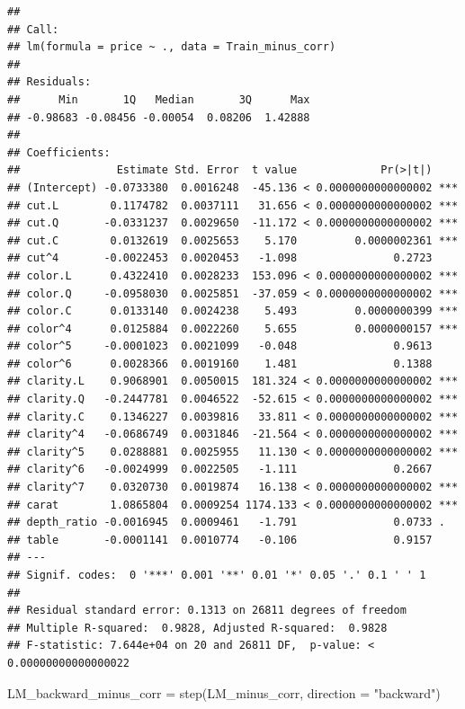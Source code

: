 \documentclass[
]{article}
\newenvironment{Shaded}{\begin{snugshade}}{\end{snugshade}}
\newcommand{\AttributeTok}[1]{\textcolor[rgb]{0.77,0.63,0.00}{#1}}
\newcommand{\FunctionTok}[1]{\textcolor[rgb]{0.00,0.00,0.00}{#1}}
\newcommand{\NormalTok}[1]{#1}
\newcommand{\OtherTok}[1]{\textcolor[rgb]{0.56,0.35,0.01}{#1}}
\newcommand{\StringTok}[1]{\textcolor[rgb]{0.31,0.60,0.02}{#1}}
\begin{document}
\begin{verbatim}
## 
## Call:
## lm(formula = price ~ ., data = Train_minus_corr)
## 
## Residuals:
##      Min       1Q   Median       3Q      Max 
## -0.98683 -0.08456 -0.00054  0.08206  1.42888 
## 
## Coefficients:
##               Estimate Std. Error  t value             Pr(>|t|)    
## (Intercept) -0.0733380  0.0016248  -45.136 < 0.0000000000000002 ***
## cut.L        0.1174782  0.0037111   31.656 < 0.0000000000000002 ***
## cut.Q       -0.0331237  0.0029650  -11.172 < 0.0000000000000002 ***
## cut.C        0.0132619  0.0025653    5.170         0.0000002361 ***
## cut^4       -0.0022453  0.0020453   -1.098               0.2723    
## color.L      0.4322410  0.0028233  153.096 < 0.0000000000000002 ***
## color.Q     -0.0958030  0.0025851  -37.059 < 0.0000000000000002 ***
## color.C      0.0133140  0.0024238    5.493         0.0000000399 ***
## color^4      0.0125884  0.0022260    5.655         0.0000000157 ***
## color^5     -0.0001023  0.0021099   -0.048               0.9613    
## color^6      0.0028366  0.0019160    1.481               0.1388    
## clarity.L    0.9068901  0.0050015  181.324 < 0.0000000000000002 ***
## clarity.Q   -0.2447781  0.0046522  -52.615 < 0.0000000000000002 ***
## clarity.C    0.1346227  0.0039816   33.811 < 0.0000000000000002 ***
## clarity^4   -0.0686749  0.0031846  -21.564 < 0.0000000000000002 ***
## clarity^5    0.0288881  0.0025955   11.130 < 0.0000000000000002 ***
## clarity^6   -0.0024999  0.0022505   -1.111               0.2667    
## clarity^7    0.0320730  0.0019874   16.138 < 0.0000000000000002 ***
## carat        1.0865804  0.0009254 1174.133 < 0.0000000000000002 ***
## depth_ratio -0.0016945  0.0009461   -1.791               0.0733 .  
## table       -0.0001141  0.0010774   -0.106               0.9157    
## ---
## Signif. codes:  0 '***' 0.001 '**' 0.01 '*' 0.05 '.' 0.1 ' ' 1
## 
## Residual standard error: 0.1313 on 26811 degrees of freedom
## Multiple R-squared:  0.9828, Adjusted R-squared:  0.9828 
## F-statistic: 7.644e+04 on 20 and 26811 DF,  p-value: < 0.00000000000000022
\end{verbatim}

\begin{Shaded}
\begin{Highlighting}[]
\NormalTok{LM\_backward\_minus\_corr }\OtherTok{=} \FunctionTok{step}\NormalTok{(LM\_minus\_corr, }\AttributeTok{direction =} \StringTok{"backward"}\NormalTok{)}
\end{Highlighting}
\end{Shaded}
\end{document}
